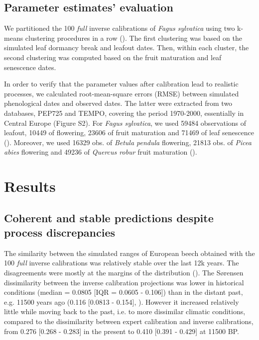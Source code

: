 \documentclass[preprint,12pt,authoryear]{elsarticle}
\begin{document}
\subsection{Parameter estimates' evaluation}

We partitioned the 100 \emph{full} inverse calibrations of \emph{Fagus sylvatica} using two k-means clustering procedures in a row (). The first clustering was based on the simulated leaf dormancy break and leafout dates. Then, within each cluster, the second clustering was computed based on the fruit maturation and leaf senescence dates.

In order to verify that the parameter values after calibration lead to realistic processes, we calculated root-mean-square errors (RMSE) between simulated phenological dates and observed dates. The latter were extracted from two databases, PEP725 and TEMPO, covering the period 1970-2000, essentially in Central Europe (Figure S2). For \emph{Fagus sylvatica}, we used 59484 observations of leafout, 10449 of flowering, 23606 of fruit maturation and 71469 of leaf senescence (). Moreover, we used 16329 obs. of \emph{Betula pendula} flowering, 21813 obs. of \emph{Picea abies} flowering and 49236 of \emph{Quercus robur} fruit maturation ().


\section{Results}

\subsection{Coherent and stable predictions despite process discrepancies}

The similarity between the simulated ranges of European beech obtained with the 100 \emph{full} inverse calibrations was relatively stable over the last 12k years. The disagreements were mostly at the margins of the distribution (). The S\o rensen dissimilarity between the inverse calibration projections was lower in historical conditions (median = 0.0805 [IQR = 0.0605 - 0.106]) than in the distant past, e.g. 11500 years ago (0.116 [0.0813 - 0.154], ). However it increased relatively little while moving back to the past, i.e. to more dissimilar climatic conditions, compared to the dissimilarity between expert calibration and inverse calibrations, from 0.276 [0.268 - 0.283] in the present to 0.410 [0.391 - 0.429] at 11500 BP.
\end{document}
